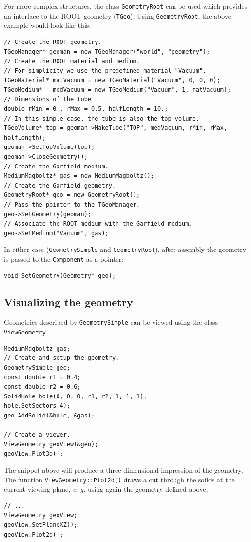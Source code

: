 For more complex structures, the class \texttt{GeometryRoot} can be used 
which provides an interface to the ROOT geometry (\texttt{TGeo}).
Using \texttt{GeometryRoot}, the above example would look like this:
\begin{lstlisting}
// Create the ROOT geometry.
TGeoManager* geoman = new TGeoManager("world", "geometry");
// Create the ROOT material and medium. 
// For simplicity we use the predefined material "Vacuum".
TGeoMaterial* matVacuum = new TGeoMaterial("Vacuum", 0, 0, 0);
TGeoMedium*   medVacuum = new TGeoMedium("Vacuum", 1, matVacuum);
// Dimensions of the tube
double rMin = 0., rMax = 0.5, halfLength = 10.;
// In this simple case, the tube is also the top volume.
TGeoVolume* top = geoman->MakeTube("TOP", medVacuum, rMin, rMax, halfLength);
geoman->SetTopVolume(top);
geoman->CloseGeometry();
// Create the Garfield medium.
MediumMagboltz* gas = new MediumMagboltz();
// Create the Garfield geometry.
GeometryRoot* geo = new GeometryRoot();
// Pass the pointer to the TGeoManager.
geo->SetGeometry(geoman);
// Associate the ROOT medium with the Garfield medium.
geo->SetMedium("Vacuum", gas); 
\end{lstlisting} 

In either case (\texttt{GeometrySimple} and \texttt{GeometryRoot}),
after assembly the geometry is passed to the \texttt{Component} as a pointer:
\begin{lstlisting}
void SetGeometry(Geometry* geo);
\end{lstlisting}

\subsection{Visualizing the geometry}

Geometries described by \texttt{GeometrySimple} can be viewed 
using the class \texttt{ViewGeometry}. 
\begin{lstlisting}
MediumMagboltz gas;
// Create and setup the geometry.
GeometrySimple geo;
const double r1 = 0.4;
const double r2 = 0.6;
SolidHole hole(0, 0, 0, r1, r2, 1, 1, 1);
hole.SetSectors(4);
geo.AddSolid(&hole, &gas);

// Create a viewer.
ViewGeometry geoView(&geo);
geoView.Plot3d();
\end{lstlisting}
The snippet above will produce a three-dimensional impression of the geometry.
The function \texttt{ViewGeometry::Plot2d()} draws a cut through the solids 
at the current viewing plane, \textit{e. g.} using again the geometry defined above,
\begin{lstlisting}
// ...
ViewGeometry geoView;
geoView.SetPlaneXZ();
geoView.Plot2d();
\end{lstlisting} 

